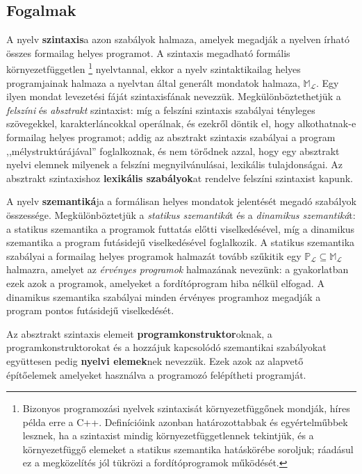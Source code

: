 \subsection{Fogalmak}
A nyelv \textbf{szintaxis}a azon szabályok halmaza, amelyek megadják a nyelven írható összes formailag helyes programot. A szintaxis megadható formális környezetfüggetlen%
\footnote{
	Bizonyos programozási nyelvek szintaxisát környezetfüggőnek mondják, híres példa erre a C++. Definícióink azonban határozottabbak és egyértelműbbek lesznek, ha a szintaxist mindig környezetfüggetlennek tekintjük, és a környezetfüggő elemeket a statikus szemantika hatáskörébe soroljuk; ráadásul ez a megközelítés jól tükrözi a fordítóprogramok működését.
}
nyelvtannal, ekkor a nyelv szintaktikailag helyes programjainak halmaza a nyelvtan által generált mondatok halmaza, $\mathbb{M}_\mathcal{L}$. Egy ilyen mondat levezetési fáját szintaxisfának nevezzük.
Megkülönböztethetjük a \textit{felszíni} és \textit{absztrakt} szintaxist: míg a felszíni szintaxis szabályai tényleges szövegekkel, karakterláncokkal operálnak, és ezekről döntik el, hogy alkothatnak-e formailag helyes programot; addig az absztrakt szintaxis szabályai a program ,,mélystruktúrájával'' foglalkoznak, és nem törődnek azzal, hogy egy absztrakt nyelvi elemnek milyenek a felszíni megnyilvánulásai, lexikális tulajdonságai.
Az absztrakt szintaxishoz \textbf{lexikális szabályok}at rendelve felszíni szintaxist kapunk.

A nyelv \textbf{szemantiká}ja a formálisan helyes mondatok jelentését megadó szabályok összessége.
Megkülönböztetjük a \textit{statikus szemantiká}t és a \textit{dinamikus szemantiká}t: a statikus szemantika a programok futtatás előtti viselkedésével, míg a dinamikus szemantika a program futásidejű viselkedésével foglalkozik.
A statikus szemantika szabályai a formailag helyes programok halmazát tovább szűkitik egy $\mathbb{P}_\mathcal{L} \subseteq \mathbb{M}_\mathcal{L}$ halmazra, amelyet az \textit{érvényes programok} halmazának nevezünk: a gyakorlatban ezek azok a programok, amelyeket a fordítóprogram hiba nélkül elfogad.
A dinamikus szemantika szabályai minden érvényes programhoz megadják a program pontos futásidejű viselkedését.

Az absztrakt szintaxis elemeit \textbf{programkonstruktor}oknak, a programkonstruktorokat és a hozzájuk kapcsolódó szemantikai szabályokat együttesen pedig \textbf{nyelvi elemek}nek nevezzük.
Ezek azok az alapvető építőelemek amelyeket használva a programozó felépítheti programját.


